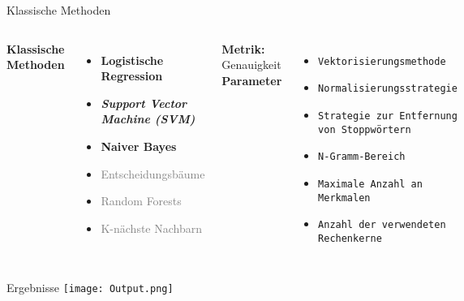 \documentclass[aspectratio=169]{beamer} %
\begin{document}
\begin{frame}{Klassische Methoden}
  \fontsize{10pt}{12pt}\selectfont
  \vspace{0.3cm}

  \begin{columns}
      \textbf{Klassische Methoden}
      \vspace{0.3cm}
      \begin{itemize}
          \item \textbf{Logistische Regression}
          \item \textbf{\textit{Support Vector Machine (SVM)}}
          \item \textbf{Naiver Bayes}
          \item \textcolor{gray}{Entscheidungsbäume}
          \item \textcolor{gray}{Random Forests}
          \item \textcolor{gray}{K-nächste Nachbarn}
      \end{itemize}
      \vspace{0.5cm}
  \textbf{Metrik:} Genauigkeit
    \vspace{-0.5cm}
      \textbf{Parameter}
      \vspace{0.3cm}
      \begin{itemize}
    \item \texttt{Vektorisierungsmethode}
    \item \texttt{Normalisierungsstrategie}
    \item \texttt{Strategie zur Entfernung von Stoppwörtern}
    \item \texttt{N-Gramm-Bereich}
    \item \texttt{Maximale Anzahl an Merkmalen}
    \item \texttt{Anzahl der verwendeten Rechenkerne}
\end{itemize}
  \end{columns}
\end{frame}

\begin{frame}{Ergebnisse}
    \centering
    \texttt{[image: Output.png]}
\end{frame}
\end{document}
